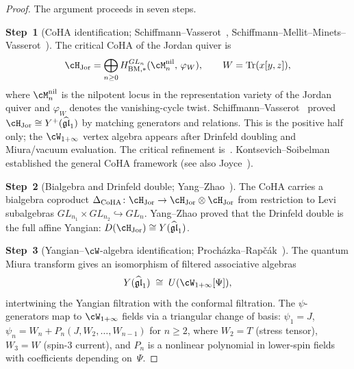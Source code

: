 \begin{proof}
The argument proceeds in seven steps.

\medskip
\noindent
\textbf{Step~1}
(CoHA identification;
Schiffmann--Vasserot~\cite{SV13},
Schiffmann--Mellit--Minets--Vasserot~\cite{SMMV23}).
The critical CoHA of the Jordan quiver is
\[
 \cH_{\mathrm{Jor}}
 = \bigoplus_{n \geq 0}
 H^{GL_n}_{\mathrm{BM},*}
 (\cM_n^{\mathrm{nil}},\, \varphi_W),
 \qquad
 W = \mathrm{Tr}(x[y,z]),
\]
where $\cM_n^{\mathrm{nil}}$ is the nilpotent locus in
the representation variety of the Jordan quiver and
$\varphi_W$ denotes the vanishing-cycle twist.
Schiffmann--Vasserot~\cite{SV13} proved
$\cH_{\mathrm{Jor}} \cong Y^+(\widehat{\mathfrak{gl}}_1)$
by matching generators and relations. This is the positive half only;
the \(\cW_{1+\infty}\) vertex algebra appears after Drinfeld doubling
and Miura/vacuum evaluation. The critical
refinement is~\cite{SMMV23}.
Kontsevich--Soibelman~\cite{KS11} established the general
CoHA framework (see also Joyce~\cite{Joyce18}).

\medskip
\noindent
\textbf{Step~2}
(Bialgebra and Drinfeld double; Yang--Zhao~\cite{YZ18a}).
The CoHA carries a bialgebra coproduct
$\Delta_{\mathrm{CoHA}} \colon
\cH_{\mathrm{Jor}} \to
\cH_{\mathrm{Jor}} \otimes \cH_{\mathrm{Jor}}$
from restriction to Levi subalgebras
$GL_{n_1} \times GL_{n_2} \hookrightarrow GL_n$.
Yang--Zhao proved that the Drinfeld double is the full
affine Yangian: $D(\cH_{\mathrm{Jor}}) \cong
Y(\widehat{\mathfrak{gl}}_1)$.

\medskip
\noindent
\textbf{Step~3}
(Yangian--$\cW$-algebra identification;
Proch\'azka--Rap\v{c}\'ak~\cite{PR19}).
The quantum Miura transform gives an isomorphism of
filtered associative algebras
\[
 Y(\widehat{\mathfrak{gl}}_1)
 \;\cong\;
 U(\cW_{1+\infty}[\Psi]),
\]
intertwining the Yangian filtration with the conformal
filtration. The $\psi$-generators map to
$\cW_{1+\infty}$ fields via a triangular change
of basis: $\psi_1 = J$,
$\psi_n = W_n + P_n(J, W_2, \ldots, W_{n-1})$
for $n \geq 2$, where $W_2 = T$ (stress tensor),
$W_3 = W$ (spin-$3$ current), and $P_n$ is a
nonlinear polynomial in lower-spin fields with
coefficients depending on~$\Psi$.


\end{proof}
